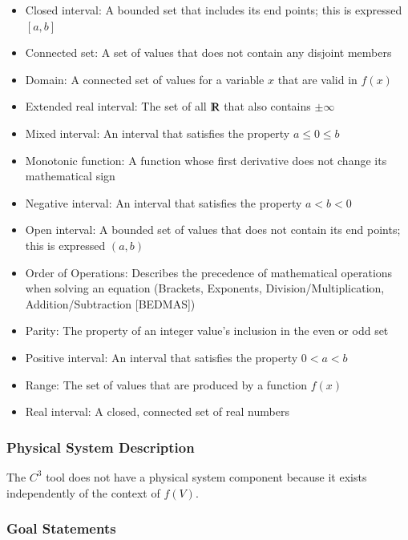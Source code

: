 \documentclass[12pt]{article}
\newcommand{\prognameAbbrv}{$C^{3}$}
\begin{document}
\begin{itemize}

\item Closed interval: A bounded set that includes its end points; this is 
expressed $[a,b]$
\item Connected set: A set of values that does not contain any disjoint members
\item Domain: A connected set of values for a variable $x$ that are valid in 
$f(x)$
\item Extended real interval: The set of all $\varmathbb{R}$ that also contains 
$\pm \infty$
\item Mixed interval: An interval that satisfies the property $a \leq 0 \leq b$
\item Monotonic function: A function whose first derivative does not change its 
mathematical sign
\item Negative interval: An interval that satisfies the property $a < b < 0$
\item Open interval: A bounded set of values that does not contain its end 
points; this is expressed $(a,b)$
\item Order of Operations: Describes the precedence of mathematical operations 
when solving an equation (Brackets, Exponents, Division/Multiplication, 
Addition/Subtraction [BEDMAS])
\item Parity: The property of an integer value's inclusion in the even or odd 
set
\item Positive interval: An interval that satisfies the property $0 < a < b$
\item Range: The set of values that are produced by a function $f(x)$
\item Real interval: A closed, connected set of real numbers

\end{itemize}

\subsubsection{Physical System Description}

The \prognameAbbrv{} tool does not have a physical system component because it 
exists independently of the context of $f(V)$. 

\subsubsection{Goal Statements}
\end{document}
